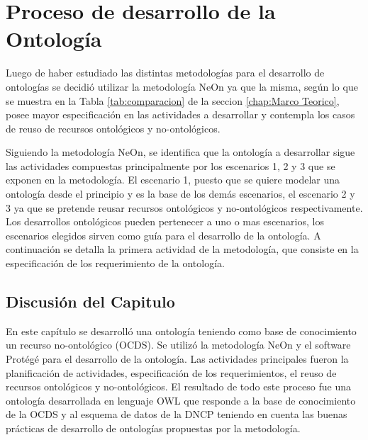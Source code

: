 \chapter{Proceso de desarrollo de la Ontología}
\label{chap:Desarrollo de la Ontologia}

Luego de haber estudiado las distintas metodologías para el desarrollo de ontologías se decidió utilizar la metodología NeOn ya que la misma, según lo que se muestra en la Tabla  \ref{tab:comparacion} de la seccion \ref{chap:Marco Teorico}, posee mayor especificación en las actividades a desarrollar  y contempla los casos de reuso de recursos ontológicos y no-ontológicos. 

Siguiendo la metodología NeOn, se identifica que la ontología a desarrollar sigue las actividades compuestas principalmente por los escenarios 1, 2 y 3 que se exponen en la metodología. El escenario 1, puesto que se quiere modelar una ontología desde el principio y es la base de los demás escenarios, el escenario 2 y 3 ya que se pretende reusar recursos ontológicos y no-ontológicos respectivamente. Los desarrollos ontológicos pueden pertenecer a uno o mas escenarios, los escenarios elegidos sirven como guía para el desarrollo de la ontología. A continuación se detalla la primera actividad de la metodología, que consiste en la especificación de los requerimiento de la ontología.









\section{Discusión del Capitulo}

En este capítulo se desarrolló una ontología teniendo como base de conocimiento un recurso no-ontológico (OCDS). Se utilizó la metodología NeOn y el software Protégé para el desarrollo de la ontología. Las actividades principales fueron la planificación de actividades, especificación de los requerimientos, el reuso de recursos ontológicos y no-ontológicos. El resultado de todo este proceso fue una ontología desarrollada en lenguaje OWL que responde a la base de conocimiento de la OCDS y al esquema de datos de la DNCP teniendo en cuenta las buenas prácticas de desarrollo de ontologías propuestas por la metodología.




